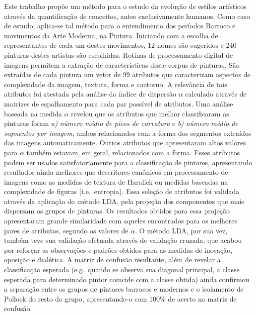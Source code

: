 

Este trabalho propõe um método para o estudo da evolução de estilos
artísticos através da quantificação de conceitos, antes exclusivamente
humanos. Como caso de estudo, aplica-se tal método para o entendimento
dos períodos Barroco e movimentos da Arte Moderna, na
Pintura. Iniciando com a escolha de representantes de cada um destes
movimentos, 12 nomes são sugeridos e 240 pinturas destes artistas são
escolhidas. Rotinas de processamento digital de imagens permitem a
extração de características deste corpus de pinturas. São extraídas de
cada pintura um vetor de 99 atributos que caracterizam aspectos de
complexidade da imagem, textura, forma e contorno.  A relevância de
tais atributos foi atestada pela análise do índice de dispersão
$\alpha$ calculado através de matrizes de espalhamento para cada par
possível de atributos. Uma análise baseada na medida $\alpha$ revelou
que os atributos que melhor classificaram as pinturas foram
\textit{a)} \emph{número médio de picos de curvatura} e \textit{b)}
\emph{número médio de segmentos por imagem}, ambos relacionados com a
forma dos segmentos extraídos das imagens automaticamente. Outros
atributos que apresentaram altos valores para $\alpha$ também estavam,
em geral, relacionados com a forma. Esses atributos podem ser usados
satisfatoriamente para a classificação de pintores, apresentando
resultados ainda melhores que descritores canônicos em processamento
de imagens como as medidas de textura de Haralick ou medidas baseadas
na complexidade de figuras (i.e.\ entropia). Essa seleção de atributos
foi validada através da aplicação do método LDA, pela projeção dos
componentes que mais dispersam os grupos de pinturas. Os resultados
obtidos para essa projeção apresentaram grande similaridade com
aqueles encontrados para os melhores pares de atributos, segundo os
valores de $\alpha$. O método LDA, por sua vez, também teve sua
validação efetuada através de validação cruzada, que acabou por
reforçar as observações e padrões obtidos para as medidas de inovação,
oposição e dialética. A matriz de confusão resultante, além de revelar
a classificação esperada (e.g.\ quando se observa sua diagonal
principal, a classe esperada para determinado pintor coincide com a
classe obtida) ainda confirmou a separação entre os grupos de pintores
barrocos e modernos e o isolamento de Pollock do resto do grupo,
apresentando-o com $100\%$ de acerto na matriz de confusão.

